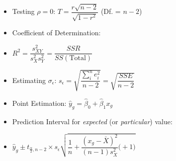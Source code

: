 \documentclass[%
 aip,
 jmp,%
 amsmath,amssymb,
 reprint,%
]{revtex4-1}
\begin{document}
\begin{itemize}[label={}]
\item Testing $\rho=0$: $T=\dfrac{r\sqrt{n-2}}{\sqrt{1-r^2}}$ {\small (Df. = $n-2$)}
\item Coefficient of Determination: 
\item $R^2=\dfrac{s_{XY}^2}{s_X^2s_Y^2}=\dfrac{SSR}{SS(\textrm{Total})}$
\item Estimating $\sigma_{\epsilon}$: $s_{\epsilon} = \sqrt{\dfrac{\sum_{i}^n e_i^2}{n-2}} = \sqrt{\dfrac{SSE}{n-2}}$ 
\item Point Estimation: $\hat{y}_g=\hat{\beta}_0+\hat{\beta}_1x_g$
\item {\small Prediction Interval for \textit{expected} (or \textit{particular}) value:}
\item $\hat{y}_g\pm t_{\frac{\alpha}{2},n-2}\times s_{\epsilon}\sqrt{\dfrac{1}{n}+\dfrac{(x_g-\bar{X})^2}{(n-1)s_X^2}\Bigg(+1\Bigg)}$
\end{itemize}
\end{document}
